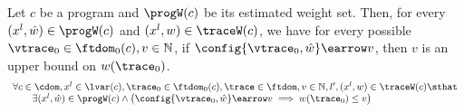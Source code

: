   {
  \begin{theorem}
    Let  ${c}$ be a program and $\progW(c)$ be its estimated weight set.
    Then, for every $(x^l, \hat{w}) \in \progW(c)$ and $(x^l, w) \in \traceW(c) $,
    we have for every possible 
    $\vtrace_0 \in \ftdom_0(c),
    v \in \mathbb{N}$,
    if  $\config{\vtrace_0, \hat{w}} \earrow v$,
    then $v$ is an upper bound on ${w}(\trace_0)$.
    \[
      \begin{array}{l}
        \forall c \in \cdom, x^l \in \lvar(c),\trace_0 \in \ftdom_0(c), \trace \in \ftdom,
    v \in \mathbb{N}, l', (x^l, w) \in \traceW(c) \sthat
    \\ \qquad 
    \exists (x^l, \hat{w}) \in \progW(c) 
    \land
    \big(
      \config{\vtrace_0, \hat{w}} \earrow v \implies w(\trace_0) \leq v
    \big)
    \end{array}
    \]
  \end{theorem}
  }
